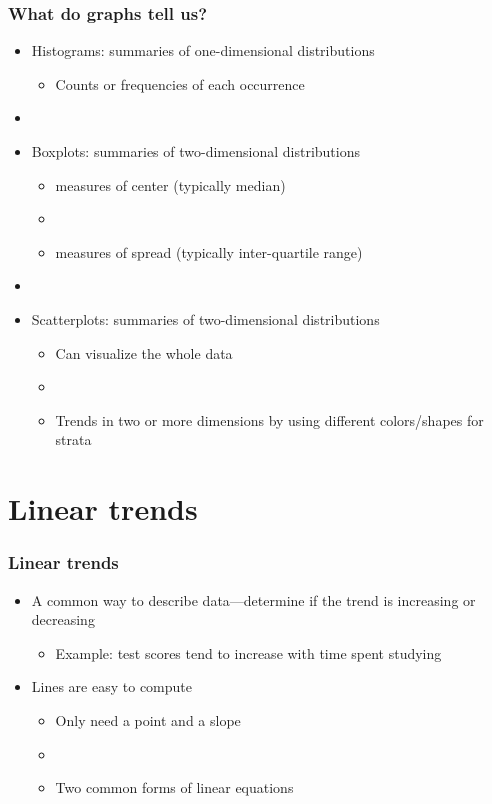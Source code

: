\documentclass[11pt, hyperref={colorlinks, urlcolor=blue}]{beamer}
\newcommand{\myframe}[1]{\begin{frame} \frametitle{#1}}
\newenvironment{spaceitemize}
{ \begin{itemize}
    \setlength{\itemsep}{10pt}
    \setlength{\parskip}{0pt}
    \setlength{\parsep}{0pt}     }
{ \end{itemize}                  }
\begin{document}
\myframe{What do graphs tell us?}
\begin{itemize}
\item Histograms: summaries of one-dimensional distributions
\begin{itemize}
\item Counts or frequencies of each occurrence
\end{itemize}
\item[]
\item Boxplots: summaries of two-dimensional distributions
\begin{itemize}
\item measures of center (typically median)
\item[]
\item measures of spread (typically inter-quartile range)
\end{itemize}
\item[]
\item Scatterplots: summaries of two-dimensional distributions
\begin{itemize}
\item Can visualize the whole data
\item[]
\item Trends in two or more dimensions by using different colors/shapes for strata
\end{itemize}
\end{itemize}
\end{frame}

\section{Linear trends}
\myframe{Linear trends}
\begin{spaceitemize}
\item A common way to describe data---determine if the trend is increasing or decreasing
\begin{itemize}
\item Example: test scores tend to increase with time spent studying
\end{itemize} 
\item Lines are easy to compute
\begin{itemize}
\item Only need a point and a slope
\item[]
\item Two common forms of linear equations
\end{itemize}
\end{spaceitemize}
\end{frame}
\end{document}
